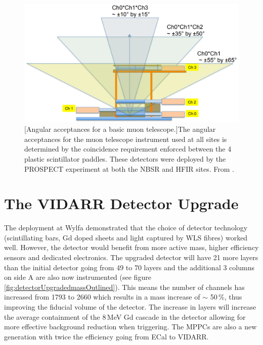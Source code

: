 \begin{figure}[!h]
 \centering
 \includegraphics[width=0.7\linewidth]{Chapter2/Figs/Raster/Prospect_MuonPaddels.png}
 [Angular acceptances for a basic muon telescope.]{The angular acceptances for the muon telescope instrument used at all sites is determined by the coincidence requirement enforced between the 4 plastic scintillator paddles. These detectors were deployed by the PROSPECT experiment at both the NBSR and HFIR sites. From \cite{Ashenfelter_2016}.} 
 \label{fig:Prospect_MuonPaddels}
\end{figure}

\vspace{3cm}

\section{The VIDARR Detector Upgrade}\label{sec:theUpgradedDetector}
The deployment at Wylfa demonstrated that the choice of detector technology (scintillating bars, Gd doped sheets and light captured by WLS fibres) worked well. However, the detector would benefit from more active mass, higher efficiency sensors and dedicated electronics. The upgraded detector will have 21 more layers than the initial detector going from 49 to 70 layers and the additional 3 columns on side A are also now instrumented (see figure \ref{fig:detectorUpgradedmassOutlined}). This means the number of channels has increased from 1793 to 2660 which results in a mass increase of $\sim$ 50\,\%, thus improving the fiducial volume of the detector. The increase in layers will increase the average containment of the 8\,MeV Gd cascade in the detector allowing for more effective background reduction when triggering. The MPPCs are also a new generation with twice the efficiency going from ECal to VIDARR. %


